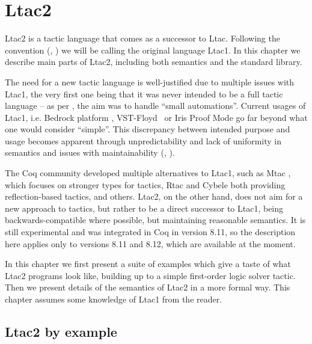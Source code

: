 \chapter{Ltac2}
\label{chap:ltac2}

Ltac2 is a tactic language that comes as a successor to Ltac.
Following the convention (\cite[Section 3.3.2]{thecoqdevelopmentteamCoqProofAssistant2020}, \cite{pedrotLtac2TacticalWarfare2019}) we will be calling the original language Ltac1.
In this chapter we describe main parts of Ltac2, including both semantics and the standard library.

The need for a new tactic language is well-justified due to multiple issues with Ltac1, the very first one being that it was never intended to be a full tactic language -- as per \citet{pedrotCoqHoTTminuteTickingClockwork2016}, the aim was to handle ``small automations''.
Current usages of Ltac1, i.e. Bedrock platform \cite{chlipalaMostlyautomatedVerificationLowlevel2011}, VST-Floyd~\cite{caoVSTFloydSeparationLogic2018} or Iris Proof Mode \cite{krebbersInteractiveProofsHigherorder2017, krebbersMoSeLGeneralExtensible2018} go far beyond what one would consider ``simple''.
This discrepancy between intended purpose and usage becomes apparent through unpredictability and lack of uniformity in semantics and issues with maintainability (\cite[Section 3.3.2]{thecoqdevelopmentteamCoqProofAssistant2020}, \cite{pedrotLtac2TacticalWarfare2019}).

The Coq community developed multiple alternatives to Ltac1, such as Mtac \cite*{zilianiMtacMonadTyped2013, kaiserMtac2TypedTactics2018a}, which focuses on stronger types for tactics,
Rtac \cite{malechaExtensibleEfficientAutomation2016} and Cybele \cite{claretLightweightProofReflection2013} both providing reflection-based tactics, and others.
Ltac2, on the other hand, does not aim for a new approach to tactics, but rather to be a direct successor to Ltac1, being backwards-compatible where possible, but maintaining reasonable semantics.
It is still experimental and was integrated in Coq in version 8.11, so the description here applies only to versions 8.11 and 8.12, which are available at the moment.

In this chapter we first present a suite of examples which give a taste of what Ltac2 programs look like, building up to a simple first-order logic solver tactic.
Then we present details of the semantics of Ltac2 in a more formal way.
This chapter assumes some knowledge of Ltac1 from the reader.

\section{Ltac2 by example}
\label{sec:ltac2-by-examples}

